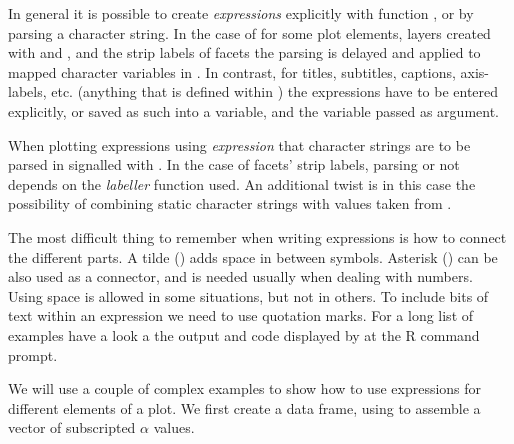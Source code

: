 \documentclass[krantz2]{krantz}\usepackage{knitr}%
\begin{document}
In general it is possible to create \emph{expressions} explicitly with function , or by parsing a character string. In the case of \ggplot for some plot elements, layers created with  and , and the strip labels of facets the parsing is delayed and applied to mapped character variables in . In contrast, for titles, subtitles, captions, axis-labels, etc. (anything that is defined within ) the expressions have to be entered explicitly, or saved as such into a variable, and the variable passed as argument.

When plotting expressions using  \emph{expression} that character strings are to be parsed in signalled with . In the case of facets' strip labels, parsing or not depends on the \emph{labeller} function used. An additional twist is in this case the possibility of combining static character strings with values taken from .

The most difficult thing to remember when writing expressions is how to connect the different parts. A tilde (\code{\textasciitilde}) adds space in between symbols. Asterisk (\code{*}) can be also used as a connector, and is needed usually when dealing with numbers. Using space is allowed in some situations, but not in others. To include bits of text within an expression we need to use quotation marks. For a long list of examples have a look a the output and code displayed by  at the R command prompt.

We will use a couple of complex examples to show how to use expressions for different elements of a plot.
We first create a data frame, using  to assemble a vector of subscripted $\alpha$ values.

\begin{knitrout}\footnotesize
{}\color{fgcolor}\begin{kframe}
\begin{alltt}
\hlstd{(}\hlstd{)} 
 \hlkwb{<-}
  \hlstd{(} \hlstd{=} \hlopt{:}\hlstd{,}
              \hlstd{=} \hlstd{(}\hlstd{),}
              \hlstd{=} \hlstd{(}\hlstr{"alpha["}\hlstd{,} \hlopt{:}\hlstd{,} \hlstr{"]"}\hlstd{,}  \hlstd{=} \hlstd{))}
\end{alltt}
\end{kframe}
\end{knitrout}
\end{document}
